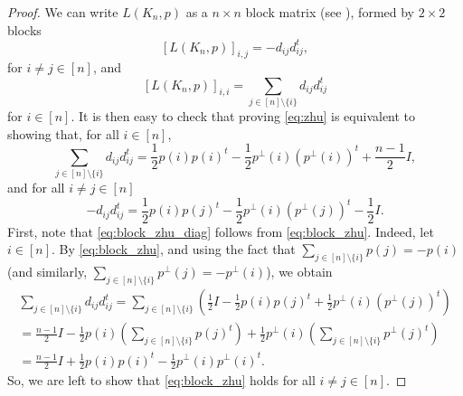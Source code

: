 \documentclass[a4paper,11pt]{article}
\theoremstyle{plain}
\theoremstyle{definition}
\begin{document}
\begin{proof}
We can write $L(K_n,p)$ as a $n\times n$ block matrix (see \cite[Section 4.4]{jordan2020rigidity}), formed by $2\times 2$ blocks
\[
[L(K_n,p)]_{i,j}= -d_{i j} d_{i j}^t,
\]
for $i\neq j\in [n]$, and
\[
[L(K_n,p)]_{i,i}=\sum_{j\in[n]\setminus\{i\}} d_{i j} d_{i j}^t
\]
for $i\in[n]$.
It is then easy to check that proving \eqref{eq:zhu} is equivalent to showing that, for all $i\in[n]$, 
\begin{equation}\label{eq:block_zhu_diag}
 \sum_{j\in[n]\setminus\{i\}} d_{i j} d_{i j}^t=\frac{1}{2} p(i)p(i)^t- \frac{1}{2}p^{\perp}(i) (p^{\perp}(i))^t  + \frac{n-1}{2} I, 
\end{equation}
and for all $i\neq j\in[n]$
\begin{equation}\label{eq:block_zhu}
-d_{i j} d_{i j}^t= \frac{1}{2} p(i)p(j)^t- \frac{1}{2}p^{\perp}(i) (p^{\perp}(j))^t  - \frac{1}{2} I.
\end{equation}
First, note that \eqref{eq:block_zhu_diag} follows from \eqref{eq:block_zhu}. Indeed, let $i\in[n]$. By \eqref{eq:block_zhu}, and using the fact that $\sum_{j\in[n]\setminus\{i\}} p(j)=-p(i)$ (and similarly, $\sum_{j\in[n]\setminus\{i\}} p^{\perp}(j)=-p^{\perp}(i)$), we obtain
\begin{multline*}
\sum_{j\in[n]\setminus\{i\}} d_{i j} d_{i j}^t= \sum_{j\in[n]\setminus\{i\}}\left( \frac{1}{2} I -\frac{1}{2}p(i)p(j)^t+\frac{1}{2}p^{\perp}(i)(p^{\perp}(j))^t\right)
\\
=\frac{n-1}{2}I -\frac{1}{2}p(i)\left(\sum_{j\in[n]\setminus\{i\}}p(j)^t\right)
+\frac{1}{2}p^{\perp}(i)\left(\sum_{j\in[n]\setminus\{i\}}p^{\perp}(j)^t\right)
\\
=\frac{n-1}{2}I +\frac{1}{2}p(i)p(i)^t
-\frac{1}{2}p^{\perp}(i)p^{\perp}(i)^t.
\end{multline*}
So, we are left to show that \eqref{eq:block_zhu} holds for all $i\neq j\in[n]$.


\end{proof}
\end{document}
